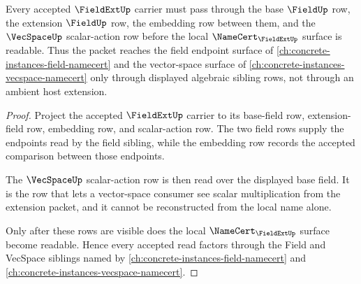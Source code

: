 \begin{theorem}
\label{thm:fieldext-vecspace-sibling-dependency}
Every accepted $\FieldExtUp$ carrier must pass through the base $\FieldUp$ row, the extension $\FieldUp$ row, the embedding row between them, and the $\VecSpaceUp$ scalar-action row before the local $\NameCert_{\FieldExtUp}$ surface is readable. Thus the packet reaches the field endpoint surface of \autoref{ch:concrete-instances-field-namecert} and the vector-space surface of \autoref{ch:concrete-instances-vecspace-namecert} only through displayed algebraic sibling rows, not through an ambient host extension.
\end{theorem}
\begin{proof}
Project the accepted $\FieldExtUp$ carrier to its base-field row, extension-field row, embedding row, and scalar-action row. The two field rows supply the endpoints read by the field sibling, while the embedding row records the accepted comparison between those endpoints.

The $\VecSpaceUp$ scalar-action row is then read over the displayed base field. It is the row that lets a vector-space consumer see scalar multiplication from the extension packet, and it cannot be reconstructed from the local name alone.

Only after these rows are visible does the local $\NameCert_{\FieldExtUp}$ surface become readable. Hence every accepted read factors through the Field and VecSpace siblings named by \autoref{ch:concrete-instances-field-namecert} and \autoref{ch:concrete-instances-vecspace-namecert}.
\end{proof}
